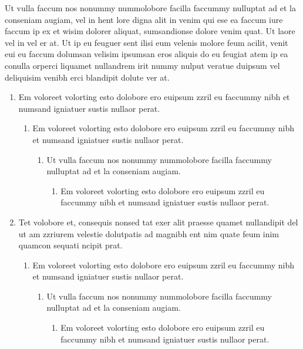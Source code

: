 Ut vulla faccum nos nonummy nummolobore facilla faccummy nulluptat ad et la conseniam augiam, vel in hent lore digna alit in venim qui ese ea faccum iure faccum ip ex et wisim dolorer aliquat, sumsandionse dolore venim quat. Ut laore vel in vel er at. Ut ip eu feuguer sent ilisi eum velenis molore feum acilit, venit eui eu faccum dolumsan velisim ipsumsan eros aliquis do eu feugiat atem ip ea conulla orperci liquamet nullandrem irit nummy nulput veratue duipsum vel deliquisim venibh erci blandipit dolute ver at.
\begin{enumerate}
\item Em voloreet volorting esto dolobore ero euipsum zzril eu faccummy nibh et numsand igniatuer sustis nullaor perat.
\begin{enumerate}
\item Em voloreet volorting esto dolobore ero euipsum zzril eu faccummy nibh et numsand igniatuer sustis nullaor perat.
\begin{enumerate}
\item Ut vulla faccum nos nonummy nummolobore facilla faccummy nulluptat ad et la conseniam augiam.
\begin{enumerate}
\item Em voloreet volorting esto dolobore ero euipsum zzril eu faccummy nibh et numsand igniatuer sustis nullaor perat.
\end{enumerate}
\end{enumerate}
\end{enumerate}
\item Tet volobore et, consequis nonsed tat exer alit praesse quamet nullandipit del ut am zzriurem velestie dolutpatis ad magnibh ent nim quate feum inim quamcon sequati ncipit prat.
\begin{enumerate}
\item Em voloreet volorting esto dolobore ero euipsum zzril eu faccummy nibh et numsand igniatuer sustis nullaor perat.
\begin{enumerate}
\item Ut vulla faccum nos nonummy nummolobore facilla faccummy nulluptat ad et la conseniam augiam.
\begin{enumerate}
\item Em voloreet volorting esto dolobore ero euipsum zzril eu faccummy nibh et numsand igniatuer sustis nullaor perat.
\end{enumerate}
\end{enumerate}
\end{enumerate}
\end{enumerate}
